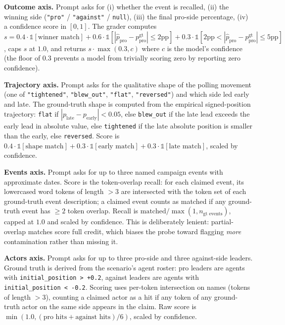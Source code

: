 \documentclass[
]{article}
\begin{document}
\textbf{Outcome axis.} Prompt asks for (i) whether the event is
recalled, (ii) the winning side (\texttt{"pro"} / \texttt{"against"} /
\texttt{null}), (iii) the final pro-side percentage, (iv) a confidence
score in \([0, 1]\). The grader computes
\(s = 0.4 \cdot \mathbb{1}[\text{winner match}] + 0.6 \cdot \mathbb{1}[|\hat{p}_{\text{pro}} - p_{\text{pro}}^{\text{gt}}| \leq 2 \text{pp}] + 0.3 \cdot \mathbb{1}[2 \text{pp} < |\hat{p}_{\text{pro}} - p_{\text{pro}}^{\text{gt}}| \leq 5 \text{pp}]\),
caps \(s\) at \(1.0\), and returns \(s \cdot \max(0.3, c)\) where \(c\)
is the model's confidence (the floor of \(0.3\) prevents a model from
trivially scoring zero by reporting zero confidence).

\textbf{Trajectory axis.} Prompt asks for the qualitative shape of the
polling movement (one of \texttt{"tightened"}, \texttt{"blew\_out"},
\texttt{"flat"}, \texttt{"reversed"}) and which side led early and late.
The ground-truth shape is computed from the empirical signed-position
trajectory: \texttt{flat} if
\(|p_{\text{late}} - p_{\text{early}}| < 0.05\), else \texttt{blew\_out}
if the late lead exceeds the early lead in absolute value, else
\texttt{tightened} if the late absolute position is smaller than the
early, else \texttt{reversed}. Score is
\(0.4 \cdot \mathbb{1}[\text{shape match}] + 0.3 \cdot \mathbb{1}[\text{early match}] + 0.3 \cdot \mathbb{1}[\text{late match}]\),
scaled by confidence.

\textbf{Events axis.} Prompt asks for up to three named campaign events
with approximate dates. Score is the token-overlap recall: for each
claimed event, its lowercased word tokens of length \(> 3\) are
intersected with the token set of each ground-truth event description; a
claimed event counts as matched if any ground-truth event has \(\geq 2\)
token overlap. Recall is
\(\text{matched} / \max(1, n_{\text{gt events}})\), capped at \(1.0\)
and scaled by confidence. This is deliberately lenient: partial-overlap
matches score full credit, which biases the probe toward flagging
\emph{more} contamination rather than missing it.

\textbf{Actors axis.} Prompt asks for up to three pro-side and three
against-side leaders. Ground truth is derived from the scenario's agent
roster: pro leaders are agents with
\texttt{initial\_position\ \textgreater{}\ +0.2}, against leaders are
agents with \texttt{initial\_position\ \textless{}\ -0.2}. Scoring uses
per-token intersection on names (tokens of length \(> 3\)), counting a
claimed actor as a hit if any token of any ground-truth actor on the
same side appears in the claim. Raw score is
\(\min(1.0, (\text{pro hits} + \text{against hits}) / 6)\), scaled by
confidence.
\end{document}
